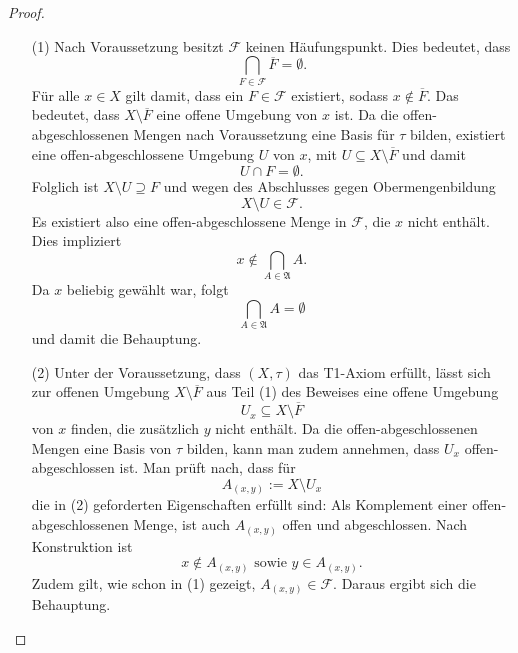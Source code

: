 \begin{proof}
  \begin{itemize}
    \item[(1)]
      Nach Voraussetzung besitzt $\mathcal{F}$ keinen Häufungspunkt.
      Dies bedeutet, dass
      \begin{displaymath}
        \bigcap_{F \in \mathcal{F}} \overline F = \emptyset.
      \end{displaymath}
      Für alle $x \in X$ gilt damit, dass ein $F \in \mathcal{F}$ existiert, sodass $x \not\in \overline{F}$.
      Das bedeutet, dass $X \setminus \overline{F}$ eine offene Umgebung von $x$ ist.
      Da die offen-abgeschlossenen Mengen nach Voraussetzung eine Basis für $\tau$ bilden, existiert eine offen-abgeschlossene Umgebung $U$ von $x$, mit $U \subseteq X \setminus \overline{F}$ und damit
      \begin{displaymath}
        U \cap F = \emptyset.
      \end{displaymath}
      Folglich ist $X \setminus U \supseteq F$ und wegen des Abschlusses gegen Obermengenbildung
      \begin{displaymath}
        X \setminus U \in \mathcal{F}.
      \end{displaymath}
      Es existiert also eine offen-abgeschlossene Menge in $\mathcal{F}$, die $x$ nicht enthält. 
      Dies impliziert
      \begin{displaymath}
        x \not\in \bigcap_{A \in \mathfrak{A}} A.
      \end{displaymath}
      Da $x$ beliebig gewählt war, folgt 
      \begin{displaymath}
       \bigcap_{A \in \mathfrak{A}} A = \emptyset
      \end{displaymath}
      und damit die Behauptung.
    \item[(2)] Unter der Voraussetzung, dass $(X,\tau)$ das T1-Axiom erfüllt, lässt sich zur offenen Umgebung $X \setminus \overline{F}$ aus Teil (1) des Beweises eine offene Umgebung 
      \begin{displaymath}
        U_x \subseteq X \setminus \overline{F}
      \end{displaymath}
      von $x$ finden, die zusätzlich $y$ nicht enthält. 
      Da die offen-abgeschlossenen Mengen eine Basis von $\tau$ bilden, kann man zudem annehmen, dass $U_x$ offen-abgeschlossen ist.
      Man prüft nach, dass für
      \begin{displaymath}
        A_{(x,y)} := X \setminus U_x
      \end{displaymath}
      die in (2) geforderten Eigenschaften erfüllt sind:
      Als Komplement einer offen-abgeschlossenen Menge, ist auch $A_{(x,y)}$ offen und abgeschlossen.
      Nach Konstruktion ist 
      \begin{displaymath}
        x \not\in A_{(x,y)} \text{ sowie } y \in A_{(x,y)}.
      \end{displaymath}
      Zudem gilt, wie schon in (1) gezeigt, $A_{(x,y)} \in \mathcal{F}$.
      Daraus ergibt sich die Behauptung. \qedhere
  \end{itemize}
\end{proof}

